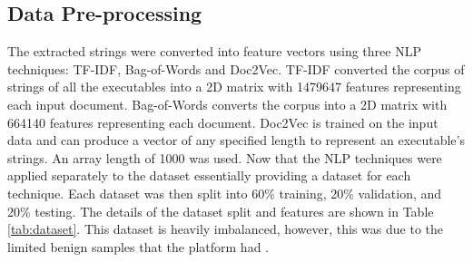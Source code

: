 \documentclass[conference]{IEEEtran}
\begin{document}
\subsection{Data Pre-processing}
The extracted strings were converted into feature vectors using three NLP techniques: TF-IDF, Bag-of-Words and Doc2Vec. 
TF-IDF converted the corpus of strings of all the executables into a 2D matrix with 1479647 features representing each input document. Bag-of-Words converts the corpus into a 2D matrix with 664140 features representing each document. Doc2Vec is trained on the input data and can produce a vector of any specified length to represent an executable's strings. An array length of 1000 was used. Now that the NLP techniques were applied separately to the dataset essentially providing a dataset for each technique. Each dataset was then split into 60\% training, 20\% validation, and 20\% testing. The details of the dataset split and features are shown in Table \ref{tab:dataset}. This dataset is heavily imbalanced, however, this was due to the limited benign samples that the platform had \cite{malfe}. 
 
\begin{table}[H]
\caption{\label{tab:dataset} NLP data metrics.}
\end{table}

  
 
\end{document}
